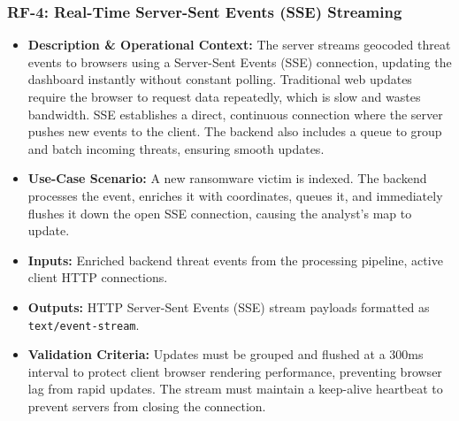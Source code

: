\subsubsection{RF-4: Real-Time Server-Sent Events (SSE) Streaming}
\begin{itemize}
    \item \textbf{Description \& Operational Context:} The server streams geocoded threat events to browsers using a Server-Sent Events (SSE) connection, updating the dashboard instantly without constant polling. Traditional web updates require the browser to request data repeatedly, which is slow and wastes bandwidth. SSE establishes a direct, continuous connection where the server pushes new events to the client. The backend also includes a queue to group and batch incoming threats, ensuring smooth updates.
    \item \textbf{Use-Case Scenario:} A new ransomware victim is indexed. The backend processes the event, enriches it with coordinates, queues it, and immediately flushes it down the open SSE connection, causing the analyst's map to update.
    \item \textbf{Inputs:} Enriched backend threat events from the processing pipeline, active client HTTP connections.
    \item \textbf{Outputs:} HTTP Server-Sent Events (SSE) stream payloads formatted as \texttt{text/}\allowbreak\texttt{event-stream}.
    \item \textbf{Validation Criteria:} Updates must be grouped and flushed at a 300ms interval to protect client browser rendering performance, preventing browser lag from rapid updates. The stream must maintain a keep-alive heartbeat to prevent servers from closing the connection.
\end{itemize}

